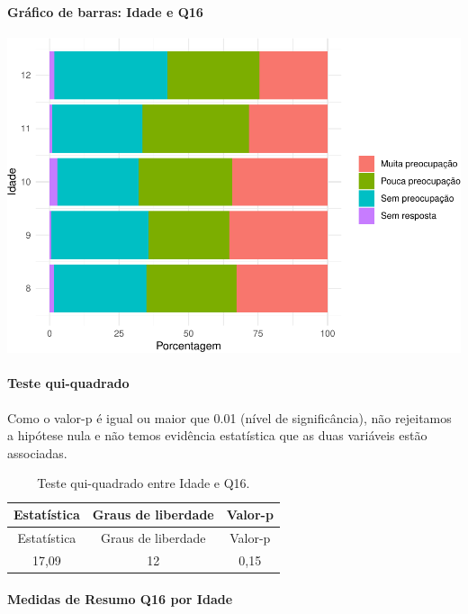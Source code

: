 \documentclass[]{article}
\let\oldparagraph\paragraph
\renewcommand{\paragraph}[1]{\oldparagraph{#1}\mbox{}}
\begin{document}
\hypertarget{gruxe1fico-de-barras-idade-e-q16}{%
\paragraph{Gráfico de barras: Idade e Q16}\label{gruxe1fico-de-barras-idade-e-q16}}

\begin{center}\includegraphics[width=0.75\linewidth]{relatorio_covid19_files/figure-latex/unnamed-chunk-151-1} \end{center}

\hypertarget{teste-qui-quadrado-14}{%
\paragraph{Teste qui-quadrado}\label{teste-qui-quadrado-14}}

Como o valor-p é igual ou maior que 0.01 (nível de significância), não rejeitamos a hipótese nula e não temos evidência estatística que as duas variáveis estão associadas.

\begin{longtable}[]{@{}ccc@{}}
\caption{\label{tab:unnamed-chunk-153}Teste qui-quadrado entre Idade e Q16.}\tabularnewline
\toprule
Estatística & Graus de liberdade & Valor-p\tabularnewline
\midrule
\endfirsthead
\toprule
Estatística & Graus de liberdade & Valor-p\tabularnewline
\midrule
\endhead
17,09 & 12 & 0,15\tabularnewline
\bottomrule
\end{longtable}

\cleardoublepage

\hypertarget{medidas-de-resumo-q16-por-idade}{%
\paragraph{Medidas de Resumo Q16 por Idade}\label{medidas-de-resumo-q16-por-idade}}
\end{document}
